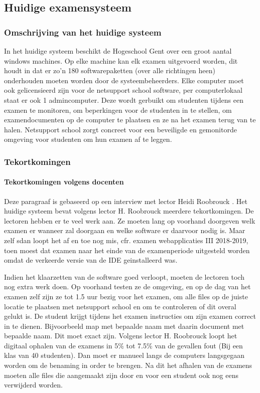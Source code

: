 \subsection{Huidige examensysteem}

\subsubsection{Omschrijving van het huidige systeem}
In het huidige systeem beschikt de Hogeschool Gent over een groot aantal windows machines. Op elke machine kan elk examen uitgevoerd worden, dit houdt in dat er zo'n 180 softwarepaketten (over alle richtingen heen) onderhouden moeten worden door de systeembeheerders. Elke computer moet ook gelicensieerd zijn voor de netsupport school software, per computerlokaal staat er ook 1 admincomputer. Deze wordt gerbuikt om studenten tijdens een examen te monitoren, om beperkingen voor de studenten in te stellen, om examendocumenten op de computer te plaatsen en ze na het examen terug van te halen. Netsupport school zorgt concreet voor een beveiligde en gemonitorde omgeving voor studenten om hun examen af te leggen. 

\subsubsection{Tekortkomingen}


\paragraph{Tekortkomingen volgens docenten}

Deze paragraaf is gebaseerd op een interview met lector Heidi Roobrouck \autocite{Roobrouck2019}. Het huidige systeem bevat volgens lector H. Roobrouck meerdere tekortkomingen. De lectoren hebben er te veel werk aan. Ze moeten lang op voorhand doorgeven welk examen er wanneer zal doorgaan en welke software er daarvoor nodig is. Maar zelf sdan loopt het af en toe nog mis, cfr. examen webapplicaties III 2018-2019, toen moest dat examen naar het einde van de examenperiode uitgesteld worden omdat de verkeerde versie van de IDE geinstalleerd was.

Indien het klaarzetten van de software goed verloopt, moeten de lectoren toch nog extra werk doen. Op voorhand testen ze de omgeving, en op de dag van het examen zelf zijn ze tot 1.5 uur bezig voor het examen, om alle files op de juiste locatie te plaatsen met netsupport school en om te controleren of dit overal gelukt is. De student krijgt tijdens het examen instructies om zijn examen correct in te dienen. Bijvoorbeeld map met bepaalde naam met daarin document met bepaalde naam. Dit moet exact zijn. Volgens lector H. Roobrouck loopt het digitaal ophalen van de examens in 5\% tot 7.5\% van de gevallen fout (Bij een klas van 40 studenten).
Dan moet er manueel langs de computers langsgegaan worden om de benaming in order te brengen. Na dit het afhalen van de examens moeten alle files die aangemaakt zijn door en voor een student ook nog eens verwijderd worden. 



